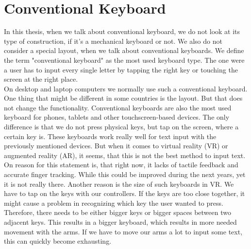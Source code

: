 \section{Conventional Keyboard}
In this thesis, when we talk about conventional keyboard, we do not look at its type of construction, if it's a mechanical keyboard or not. We also do not consider a special layout, when we talk about conventional keyboards. We define the term "conventional keyboard" as the most used keyboard type. The one were a user has to input every single letter by tapping the right key or touching the screen at the right place.\\
On desktop and laptop computers we normally use such a conventional keyboard. One thing that might be different in some countries is the layout. But that does not change the functionality. Conventional keyboards are also the most used keyboard for phones, tablets and other touchscreen-based devices. The only difference is that we do not press physical keys, but tap on the screen, where a certain key is. These keyboards work really well for text input with the previously mentioned devices. But when it comes to virtual reality (VR) or augmented reality (AR), it seems, that this is not the best method to input text. On reason for this statement is, that right now, it lacks of tactile feedback and accurate finger tracking. While this could be improved during the next years, yet it is not really there. Another reason is the size of such keyboards in VR. We have to tap on the keys with our controllers. If the keys are too close together, it might cause a problem in recognizing which key the user wanted to press. Therefore, there needs to be either bigger keys or bigger spaces between two adjacent keys. This results in a bigger keyboard, which results in more needed movement with the arms. If we have to move our arms a lot to input some text, this can quickly become exhausting.


